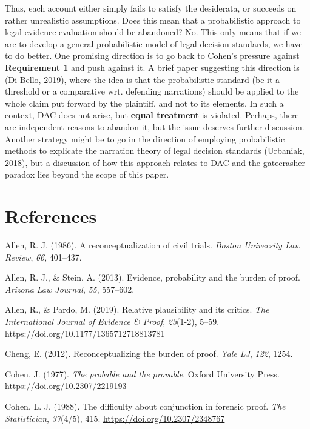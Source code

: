 \documentclass[10pt,dvipsnames,enabledeprecatedfontcommands]{scrartcl}
\begin{document}
Thus, each account either simply fails to satisfy the desiderata, or
succeeds on rather unrealistic assumptions. Does this mean that a
probabilistic approach to legal evidence evaluation should be abandoned?
No. This only means that if we are to develop a general probabilistic
model of legal decision standards, we have to do better. One promising
direction is to go back to Cohen's pressure against
\textbf{Requirement 1} and push against it. A brief paper suggesting
this direction is (Di Bello, 2019), where the idea is that the
probabilistic standard (be it a threshold or a comparative wrt.
defending narrations) should be applied to the whole claim put forward
by the plaintiff, and not to its elements. In such a context, DAC does
not arise, but \textbf{equal treatment} is violated. Perhaps, there are
independent reasons to abandon it, but the issue deserves further
discussion. Another strategy might be to go in the direction of
employing probabilistic methods to explicate the narration theory of
legal decision standards (Urbaniak, 2018), but a discussion of how this
approach relates to DAC and the gatecrasher paradox lies beyond the
scope of this paper.

\section*{References}\label{references}

\hypertarget{refs}{}
\hypertarget{ref-Allen1986A-Reconceptuali}{}
Allen, R. J. (1986). A reconceptualization of civil trials. \emph{Boston
University Law Review}, \emph{66}, 401--437.

\hypertarget{ref-allen2013}{}
Allen, R. J., \& Stein, A. (2013). Evidence, probability and the burden
of proof. \emph{Arizona Law Journal}, \emph{55}, 557--602.

\hypertarget{ref-AllenPardo2019relative}{}
Allen, R., \& Pardo, M. (2019). Relative plausibility and its critics.
\emph{The International Journal of Evidence \& Proof}, \emph{23}(1-2),
5--59. \url{https://doi.org/10.1177/1365712718813781}

\hypertarget{ref-cheng2012reconceptualizing}{}
Cheng, E. (2012). Reconceptualizing the burden of proof. \emph{Yale LJ},
\emph{122}, 1254.

\hypertarget{ref-Cohen1977The-probable-an}{}
Cohen, J. (1977). \emph{The probable and the provable}. Oxford
University Press. \url{https://doi.org/10.2307/2219193}

\hypertarget{ref-cohen1988difficulty}{}
Cohen, L. J. (1988). The difficulty about conjunction in forensic proof.
\emph{The Statistician}, \emph{37}(4/5), 415.
\url{https://doi.org/10.2307/2348767}
\end{document}
